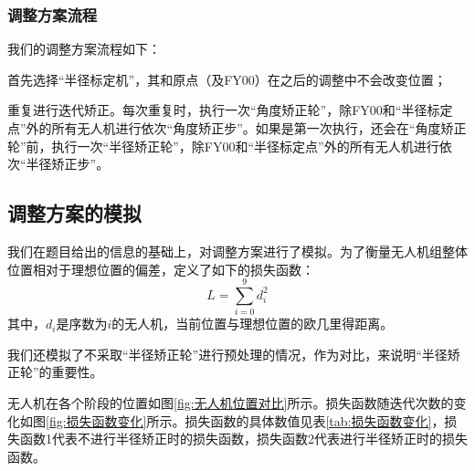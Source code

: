 \documentclass[12pt,AutoFakeSlant,AutoFakeBold]{article}
\begin{document}
\subsubsection{调整方案流程}

我们的调整方案流程如下：
\begin{enumerate*}
    \item 首先选择“半径标定机”，其和原点（及FY00）在之后的调整中不会改变位置；
    \item 重复进行迭代矫正。每次重复时，执行一次“角度矫正轮”，除FY00和“半径标定点”外的所有无人机进行依次“角度矫正步”。如果是第一次执行，还会在“角度矫正轮”前，执行一次“半径矫正轮”，除FY00和“半径标定点”外的所有无人机进行依次“半径矫正步”。
\end{enumerate*}

\subsection{调整方案的模拟}

我们在题目给出的信息的基础上，对调整方案进行了模拟。为了衡量无人机组整体位置相对于理想位置的偏差，定义了如下的损失函数：
\begin{equation}
    L = \sum_{i=0}^{9} d_i^2
\end{equation}
其中，$d_i$是序数为$i$的无人机，当前位置与理想位置的欧几里得距离。

我们还模拟了不采取“半径矫正轮”进行预处理的情况，作为对比，来说明“半径矫正轮”的重要性。

无人机在各个阶段的位置如图\ref{fig:无人机位置对比}所示。损失函数随迭代次数的变化如图\ref{fig:损失函数变化}所示。损失函数的具体数值见表\ref{tab:损失函数变化}，损失函数1代表不进行半径矫正时的损失函数，损失函数2代表进行半径矫正时的损失函数。
\end{document}
